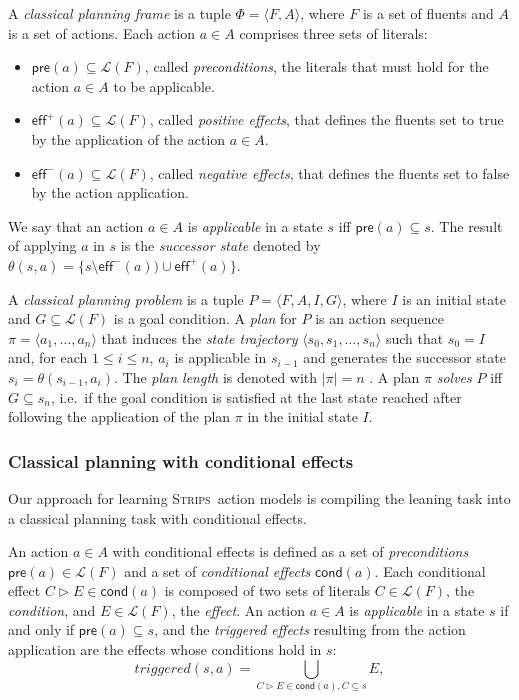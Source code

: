 \documentclass{article}
\newcommand{\tup}[1]{{\langle #1 \rangle}}
\newcommand{\pre}{\mathsf{pre}}     %
\newcommand{\eff}{\mathsf{eff}}     %
\newcommand{\cond}{\mathsf{cond}}   %
\newcommand{\strips}{\textsc{Strips}}     %
\begin{document}
A {\em classical planning frame} is a tuple $\Phi=\tup{F,A}$, where $F$ is a set of fluents and $A$ is a set of actions. Each action $a\in A$ comprises three sets of literals:
\begin{itemize}
\item $\pre(a)\subseteq\mathcal{L}(F)$, called {\em preconditions}, the literals that must hold for the action $a\in A$ to be applicable.
\item $\eff^+(a)\subseteq\mathcal{L}(F)$, called {\em positive effects}, that defines the fluents set to true by the application of the action $a\in A$.
\item $\eff^-(a)\subseteq\mathcal{L}(F)$, called {\em negative effects}, that defines the fluents set to false by the action application.
\end{itemize}
We say that an action $a\in A$ is {\em applicable} in a state $s$ iff $\pre(a)\subseteq s$. The result of applying $a$ in $s$ is the {\em successor state} denoted by $\theta(s,a)=\{s\setminus\eff^-(a))\cup\eff^+(a)\}$.

A {\em classical planning problem} is a tuple $P=\tup{F,A,I,G}$, where $I$ is an initial state and $G\subseteq\mathcal{L}(F)$ is a goal condition. A {\em plan} for $P$ is an action sequence $\pi=\tup{a_1, \ldots, a_n}$ that induces the {\em state trajectory} $\tup{s_0, s_1, \ldots, s_n}$ such that $s_0=I$ and, for each {\small $1\leq i\leq n$}, $a_i$ is applicable in $s_{i-1}$ and generates the successor state $s_i=\theta(s_{i-1},a_i)$. The {\em plan length} is denoted with $|\pi|=n$ . A plan $\pi$ {\em solves} $P$ iff $G\subseteq s_n$, i.e.~if the goal condition is satisfied at the last state reached after following the application of the plan $\pi$ in the initial state $I$.


\subsubsection{Classical planning with conditional effects}
Our approach for learning \strips\ action models is compiling the leaning task into a classical planning task with conditional effects.

An action $a\in A$ with conditional effects is defined as a set of {\em preconditions} $\pre(a)\in\mathcal{L}(F)$ and a set of {\em conditional effects} $\cond(a)$. Each conditional effect $C\rhd E\in\cond(a)$ is composed of two sets of literals $C\in\mathcal{L}(F)$, the {\em condition}, and $E\in\mathcal{L}(F)$, the {\em effect}. An action $a\in A$ is {\em applicable} in a state $s$ if and only if $\pre(a)\subseteq s$, and the {\em triggered effects} resulting from the action application are the effects whose conditions hold in $s$:
\[
triggered(s,a)=\bigcup_{C\rhd E\in\cond(a),C\subseteq s} E,
\]
\end{document}
